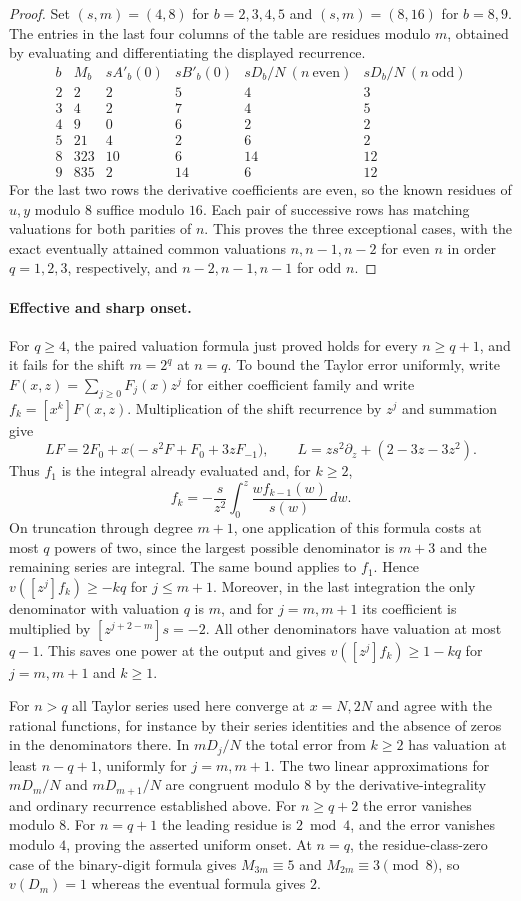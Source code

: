 \documentclass[11pt,a4paper]{article}
\begin{document}
\begin{proof}
Set $(s,m)=(4,8)$ for $b=2,3,4,5$ and $(s,m)=(8,16)$ for $b=8,9$.
The entries in the last four columns of the table are residues modulo
$m$, obtained by evaluating and differentiating the displayed recurrence.
\[
\begin{array}{c|r|rr|rr}
 b & M_b & s A'_b(0)& s B'_b(0)& sD_b/N\ (n\ \mathrm{even})&
 sD_b/N\ (n\ \mathrm{odd})\\\hline
 2&2&2&5&4&3\\
 3&4&2&7&4&5\\
 4&9&0&6&2&2\\
 5&21&4&2&6&2\\
 8&323&10&6&14&12\\
 9&835&2&14&6&12
\end{array}
\]
For the last two rows the derivative coefficients are even, so the known
residues of $u,y$ modulo $8$ suffice modulo $16$. Each pair of successive
rows has matching valuations for both parities of $n$. This proves the
three exceptional cases, with the exact eventually attained common
valuations $n,n-1,n-2$ for even $n$ in order $q=1,2,3$, respectively,
and $n-2,n-1,n-1$ for odd $n$.
\end{proof}
\paragraph{Effective and sharp onset.}
For $q\ge4$, the paired valuation formula just proved holds for every $n\ge q+1$, and it fails for the shift $m=2^q$ at $n=q$. To bound the Taylor error uniformly, write $F(x,z)=\sum_{j\ge0}F_j(x)z^j$ for either coefficient family and write $f_k=[x^k]F(x,z)$. Multiplication of the shift recurrence by $z^j$ and summation give
\[
 L F=2F_0+x\bigl(-s^2 F+F_0+3zF_{-1}\bigr),\qquad
 L=zs^2\partial_z+(2-3z-3z^2).
\]
Thus $f_1$ is the integral already evaluated and, for $k\ge2$,
\[
 f_k=-\frac{s}{z^2}\int_0^z\frac{w f_{k-1}(w)}{s(w)}\,dw .
\]
On truncation through degree $m+1$, one application of this formula costs at most $q$ powers of two, since the largest possible denominator is $m+3$ and the remaining series are integral. The same bound applies to $f_1$. Hence $v([z^j] f_k)\ge-kq$ for $j\le m+1$. Moreover, in the last integration the only denominator with valuation $q$ is $m$, and for $j=m,m+1$ its coefficient is multiplied by $[z^{j+2-m}]s=-2$. All other denominators have valuation at most $q-1$. This saves one power at the output and gives $v([z^j]f_k)\ge1-kq$ for $j=m,m+1$ and $k\ge1$.

For $n>q$ all Taylor series used here converge at $x=N,2N$ and agree with the rational functions, for instance by their series identities and the absence of zeros in the denominators there. In $mD_j/N$ the total error from $k\ge2$ has valuation at least $n-q+1$, uniformly for $j=m,m+1$. The two linear approximations for $mD_m/N$ and $mD_{m+1}/N$ are congruent modulo $8$ by the derivative-integrality and ordinary recurrence established above. For $n\ge q+2$ the error vanishes modulo $8$. For $n=q+1$ the leading residue is $2\bmod4$, and the error vanishes modulo $4$, proving the asserted uniform onset. At $n=q$, the residue-class-zero case of the binary-digit formula gives $M_{3m}\equiv5$ and $M_{2m}\equiv3\pmod8$, so $v(D_m)=1$ whereas the eventual formula gives $2$.
\end{document}
